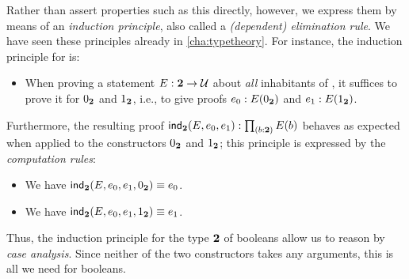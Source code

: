 %
Rather than assert properties such as this directly, however, we express them by means of an \emph{induction principle}, also called a \emph{(dependent) elimination rule}.
We have seen these principles already in \autoref{cha:typetheory}.
For instance, the induction principle for \bool is:
%
\begin{itemize}
\item When proving a statement $E : \mathbf{2} \to \mathcal{U}$ about \emph{all} inhabitants of \bool, it suffices to prove it for ${0_{\mathbf{2}}}$ and ${1_{\mathbf{2}}}$, i.e., to give proofs $e_0 : E({0_{\mathbf{2}}})$ and $e_1 : E({1_{\mathbf{2}}})$.
\end{itemize}

Furthermore, the resulting proof $\ind\bool(E,e_0,e_1): \prd{b : \bool}E(b)$ behaves as expected when applied to the constructors ${0_{\mathbf{2}}}$ and ${1_{\mathbf{2}}}$; this principle is expressed by the \emph{computation rules}:
\begin{itemize}
\item We have $\mathsf{ind}_{\mathbf{2}}(E,e_0,e_1,{0_{\mathbf{2}}}) \equiv e_0$.
\item We have $\mathsf{ind}_{\mathbf{2}}(E,e_0,e_1,{1_{\mathbf{2}}}) \equiv e_1$.
\end{itemize}

%
Thus, the induction principle for the type $\mathbf{2}$ of booleans allow us to reason by \emph{case analysis}.
Since neither of the two constructors takes any arguments, this is all we need for booleans.

